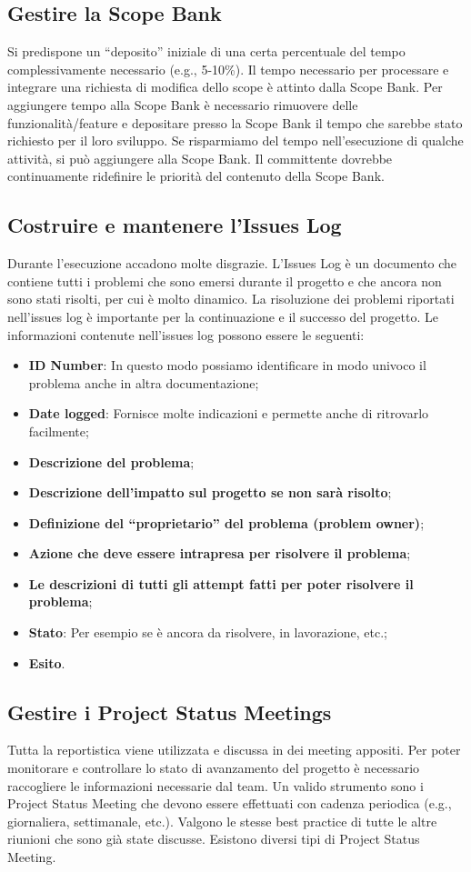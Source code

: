 \subsection{Gestire la Scope Bank}
Si predispone un “deposito” iniziale di una certa percentuale del tempo complessivamente necessario (e.g., 5-10\%).
Il tempo necessario per processare e integrare una richiesta di modifica dello scope è attinto dalla Scope Bank.
Per aggiungere tempo alla Scope Bank è necessario rimuovere delle funzionalità/feature e depositare presso la Scope Bank il tempo che sarebbe stato richiesto per il loro sviluppo.
Se risparmiamo del tempo nell’esecuzione di qualche attività, si può aggiungere alla Scope Bank.
Il committente dovrebbe continuamente ridefinire le priorità del contenuto della Scope Bank.
\subsection{Costruire e mantenere l’Issues Log}
Durante l'esecuzione accadono molte disgrazie. L’Issues Log è un documento che contiene tutti i problemi che sono emersi durante il progetto e che ancora non sono stati risolti, per cui è molto dinamico.
La risoluzione dei problemi riportati nell’issues log è importante per la continuazione e il successo del progetto.
Le informazioni contenute nell’issues log possono essere le seguenti:
\begin{itemize}
	\item \textbf{ID Number}: In questo modo possiamo identificare in modo univoco il problema anche in altra documentazione;
	\item \textbf{Date logged}: Fornisce molte indicazioni e permette anche di ritrovarlo facilmente;
	\item \textbf{Descrizione del problema};
	\item \textbf{Descrizione dell’impatto sul progetto se non sarà risolto};
	\item \textbf{Definizione del “proprietario” del problema (problem owner)};
	\item \textbf{Azione che deve essere intrapresa per risolvere il problema};
	\item \textbf{Le descrizioni di tutti gli attempt fatti per poter risolvere il problema};
	\item \textbf{Stato}: Per esempio se è ancora da risolvere, in lavorazione, etc.;
	\item \textbf{Esito}.
\end{itemize}

\subsection{Gestire i Project Status Meetings}
Tutta la reportistica viene utilizzata e discussa in dei meeting appositi.
Per poter monitorare e controllare lo stato di avanzamento del progetto è necessario raccogliere le informazioni necessarie dal team.
Un valido strumento sono i Project Status Meeting che devono essere effettuati con cadenza periodica (e.g., giornaliera, settimanale, etc.). Valgono le stesse best practice di tutte le altre riunioni che sono già state discusse. Esistono diversi tipi di Project Status Meeting.

